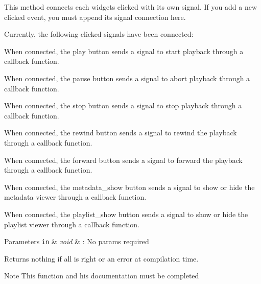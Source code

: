 This method connects each widgets clicked with its own signal. If you add a new clicked event, you must append its signal connection here.\par
 \par
 Currently, the following clicked signals have been connected\-:\par
 \begin{DoxyItemize}
\item { When} connected, the play button sends a signal to start playback through a callback function. \item { When} connected, the pause button sends a signal to abort playback through a callback function. \item { When} connected, the stop button sends a signal to stop playback through a callback function. \item { When} connected, the rewind button sends a signal to rewind the playback through a callback function. \item { When} connected, the forward button sends a signal to forward the playback through a callback function. \item { When} connected, the metadata\-\_\-show button sends a signal to show or hide the metadata viewer through a callback function. \item { When} connected, the playlist\-\_\-show button sends a signal to show or hide the playlist viewer through a callback function. \par
 \par
 
\begin{DoxyParams}[1]{Parameters}
\mbox{\tt in}  & {\em void} & \-: No params required \\
\hline
\end{DoxyParams}
\begin{DoxyReturn}{Returns}
nothing if all is right or an error at compilation time. 
\end{DoxyReturn}
\begin{DoxyNote}{Note}
This function and his documentation must be completed 
\end{DoxyNote}
\end{DoxyItemize}



